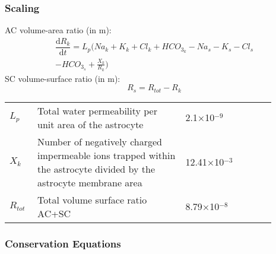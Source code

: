 \subsubsection*{Scaling}
%
\gls{AC}  volume-area ratio (in m):
\begin{equation} \label{eq:R_k}
\begin{aligned}
\dfrac{\mathrm{d}R_k}{\mathrm{d}t}= L_p( Na_k+K_k+Cl_k+HCO_{3_k}-Na_s-K_s-Cl_s\\
-HCO_{3_{s}}+\frac{X_k}{R_k})
\end{aligned}
\end{equation}
%
\gls{SC} volume-surface ratio  (in m):
\begin{equation} \label{eq:R_tot}
R_s = R_{tot} - R_k  
\end{equation}
%
\begin{table}[h!]
\centering
\begin{tabular}{ p{0.09\linewidth}  >{\footnotesize} p{0.5\linewidth}  >{\footnotesize} p{0.27\linewidth} >{\footnotesize} p{0.03\linewidth} }
\hline
$L_p$ 			& Total water permeability per unit area of the astrocyte 			& 2.1$\times$10$^{-9}$ \mperuMs &  \cite{Ostby2009}  \\
$X_k$			& Number of negatively charged impermeable ions trapped within the astrocyte divided by the astrocyte membrane area								& 12.41$\times$10$^{-3}$ \uMm & \cite{Ostby2009}  \\
$R_{tot}$ 		& Total volume surface ratio AC+SC   		& 8.79$\times$10$^{-8}$ \m & \cite{Ostby2009}  \\
\hline
\end{tabular}
\end{table}

\subsubsection*{Conservation Equations}
